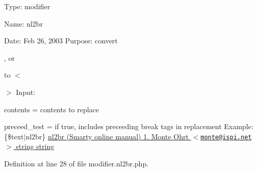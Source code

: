 \-Type\-: modifier\par
 \-Name\-: nl2br\par
 \-Date\-: \-Feb 26, 2003 \-Purpose\-: convert \par
,  or \par
 to $<$\par
$>$ \-Input\-:\par

\begin{DoxyItemize}
\item contents = contents to replace
\item preceed\-\_\-test = if true, includes preceeding break tags in replacement \-Example\-: \{\$text$|$nl2br\} \hyperlink{}{nl2br (\-Smarty online manual)  1.  \-Monte \-Ohrt $<$\href{mailto:monte@ispi.net}{\tt monte@ispi.\-net}$>$  string  string }
\end{DoxyItemize}

\-Definition at line 28 of file modifier.\-nl2br.\-php.


